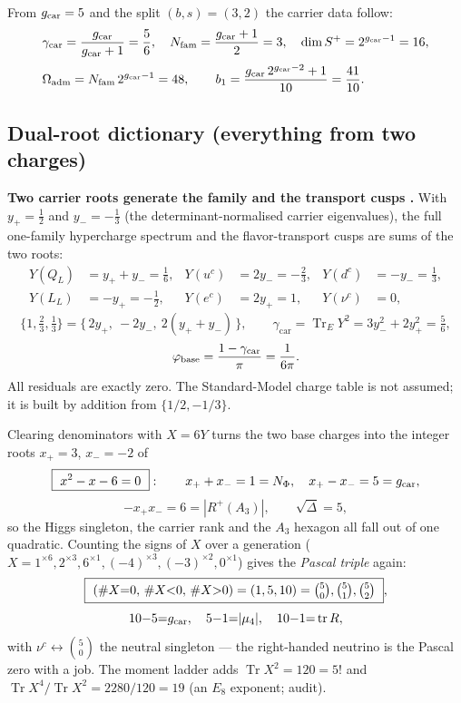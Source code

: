 From $g_{\mathrm{car}}=5$ and the split $(b,s)=(3,2)$ the carrier data follow:
\begin{equation}
\begin{aligned}
  &\gamma_{\mathrm{car}}=\frac{g_{\mathrm{car}}}{g_{\mathrm{car}}+1}=\frac56,\quad
  N_{\mathrm{fam}}=\frac{g_{\mathrm{car}}+1}{2}=3,\quad
  \dim S^+=2^{g_{\mathrm{car}}-1}=16,\\[2pt]
  &\Omega_{\mathrm{adm}}=N_{\mathrm{fam}}\,2^{g_{\mathrm{car}}-1}=48,\qquad
  b_1=\frac{g_{\mathrm{car}}\,2^{g_{\mathrm{car}}-2}+1}{10}=\frac{41}{10}.
\end{aligned}
\end{equation}

\subsection{Dual-root dictionary (everything from two charges)}

\par\smallskip\noindent\textbf{Two carrier roots generate the family and the transport cusps \mE.}
With $y_+=\tfrac12$ and $y_-=-\tfrac13$ (the determinant-normalised carrier eigenvalues), the full
one-family hypercharge spectrum and the flavor-transport cusps are sums of the two roots:
\[
  \begin{aligned}
  Y(Q_L)&=y_++y_-=\tfrac16, & Y(u^c)&=2y_-=-\tfrac23, & Y(d^c)&=-y_-=\tfrac13,\\
  Y(L_L)&=-y_+=-\tfrac12, & Y(e^c)&=2y_+=1, & Y(\nu^c)&=0,
  \end{aligned}
\]
\[
  \{1,\tfrac23,\tfrac13\}=\{\,2y_+,\ -2y_-,\ 2(y_++y_-)\,\},\qquad
  \gamma_{\mathrm{car}}=\operatorname{Tr}_E Y^2=3y_-^2+2y_+^2=\tfrac56,
\]
\[
  \varphi_{\mathrm{base}}=\frac{1-\gamma_{\mathrm{car}}}{\pi}=\frac{1}{6\pi}.
\]
All residuals are exactly zero. The Standard-Model charge table is not assumed; it is built by
addition from $\{1/2,-1/3\}$.
\par\smallskip

\begin{keybox}[The $X=6Y$ quadratic and the hypercharge Pascal-sign duality \mE]
Clearing denominators with $X=6Y$ turns the two base charges into the integer roots $x_+=3$, $x_-=-2$ of
\[
  \boxed{\ x^2-x-6=0\ }:\qquad
  x_++x_-=1=N_\Phi,\quad x_+-x_-=5=g_{\mathrm{car}},
\]
\[
  -x_+x_-=6=|R^+(A_3)|,\qquad \sqrt{\Delta}=5,
\]
so the Higgs singleton, the carrier rank and the $A_3$ hexagon all fall out of one quadratic. Counting
the signs of $X$ over a generation ($X=1^{\times6},2^{\times3},6^{\times1},(-4)^{\times3},(-3)^{\times2},0^{\times1}$)
gives the \emph{Pascal triple} again:
\[
  \boxed{\ (\#X{=}0,\,\#X{<}0,\,\#X{>}0)=(1,5,10)=\tbinom50,\tbinom51,\tbinom52\ },
\]
\[
  10{-}5{=}g_{\mathrm{car}},\quad 5{-}1{=}|\mu_4|,\quad 10{-}1{=}\operatorname{tr}R,
\]
with $\nu^c\leftrightarrow\binom50$ the neutral singleton --- the right-handed neutrino is the Pascal zero
with a job. The moment ladder adds $\operatorname{Tr}X^2=120=5!$ and
$\operatorname{Tr}X^4/\operatorname{Tr}X^2=2280/120=19$ (an $E_8$ exponent; audit). \mE
\end{keybox}

